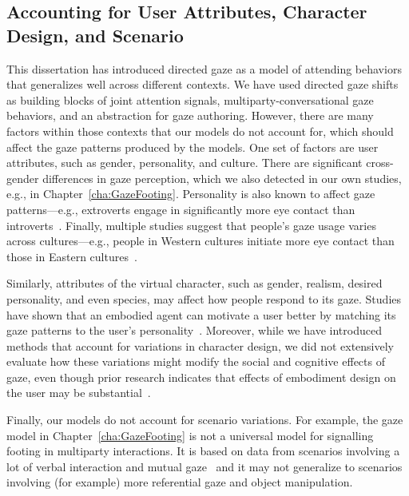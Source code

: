 \subsection{Accounting for User Attributes, Character Design, and Scenario}

This dissertation has introduced directed gaze as a model of attending behaviors that generalizes well across different contexts. We have used directed gaze shifts as building blocks of joint attention signals, multiparty-conversational gaze behaviors, and an abstraction for gaze authoring. However, there are many factors within those contexts that our models do not account for, which should affect the gaze patterns produced by the models. One set of factors are user attributes, such as gender, personality, and culture. There are significant cross-gender differences in gaze perception, which we also detected in our own studies, e.g., in Chapter~\ref{cha:GazeFooting}. Personality is also known to affect gaze patterns---e.g., extroverts engage in significantly more eye contact than introverts~\citep{rutter1972visual}. Finally, multiple studies suggest that people's gaze usage varies across cultures---e.g., people in Western cultures initiate more eye contact than those in Eastern cultures~\citep{mccarthy2006cultural,mccarthy2008gaze}.

Similarly, attributes of the virtual character, such as gender, realism, desired personality, and even species, may affect how people respond to its gaze. Studies have shown that an embodied agent can motivate a user better by matching its gaze patterns to the user's personality~\citep{andrist2015look}. Moreover, while we have introduced methods that account for variations in character design, we did not extensively evaluate how these variations might modify the social and cognitive effects of gaze, even though prior research indicates that effects of embodiment design on the user may be substantial~\citep{parise1996my,baylor2009promoting}.

Finally, our models do not account for scenario variations. For example, the gaze model in Chapter~\ref{cha:GazeFooting} is not a universal model for signalling footing in multiparty interactions. It is based on data from scenarios involving a lot of verbal interaction and mutual gaze~\citep{mutlu2012conversational} and it may not generalize to scenarios involving (for example) more referential gaze and object manipulation.

